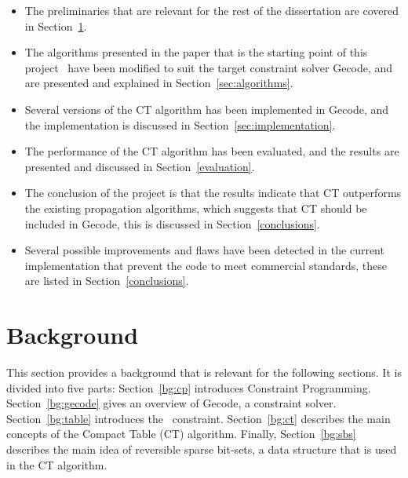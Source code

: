 \documentclass[a4paper,11pt]{article}
\newcommand{\Secref}[1]{Section~\ref{#1}}
\newcommand{\Table}{\Constraint{Table}}
\numberwithin{equation}{section}
\begin{document}

\begin{itemize}
  \item The preliminaries that are relevant for the rest of the dissertation
    are covered in \Secref{bg}.

  \item The algorithms presented in the paper that is the starting point of this 
    project~\cite{DBLP:conf/cp/DemeulenaereHLP16} 
    have been modified to suit the target constraint solver Gecode, and are presented and explained in 
    \Secref{sec:algorithms}.

  \item Several versions of the CT algorithm has been implemented in Gecode, and
    the implementation is discussed in \Secref{sec:implementation}.

  \item The performance of the CT algorithm has been evaluated,
    and the results
    are presented and discussed in \Secref{evaluation}.

  \item The conclusion of the project is that the results indicate
    that CT outperforms the existing propagation algorithms, which
    suggests that CT should be included in Gecode, this is discussed
    in \Secref{conclusions}.

  \item Several possible improvements and flaws have been detected in the current
    implementation that prevent the code to meet commercial standards, these
    are listed in \Secref{conclusions}.
        
\end{itemize}

\section{Background}
\label{bg}


This section provides a background that is relevant for the
following sections. It is divided into five parts: \Secref{bg:cp}
introduces Constraint Programming. \Secref{bg:gecode} gives an overview
of Gecode, a constraint solver. \Secref{bg:table} introduces the~\Table
constraint. \Secref{bg:ct} describes the main concepts of the Compact
Table (CT) algorithm. Finally, \Secref{bg:sbs} describes the main
idea of reversible sparse bit-sets,
a data structure that is used in the CT algorithm.
\end{document}

